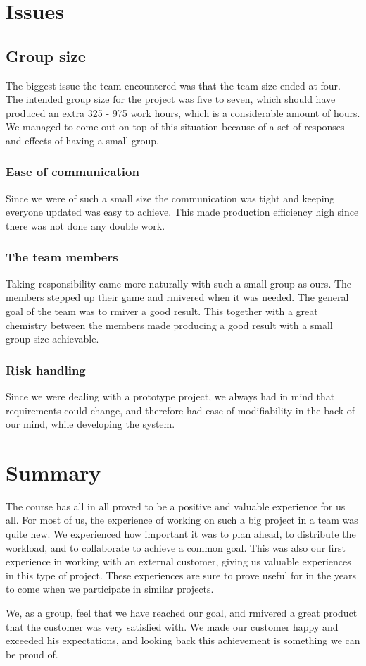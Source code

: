 \section{Issues}

\subsection*{Group size}
The biggest issue the team encountered was that the team size ended at four. The intended group size for the project was five to seven, which should have produced an extra 325 - 975 work hours, which is a considerable amount of hours. We managed to come out on top of this situation because of a set of responses and effects of having a small group.

\subsubsection*{Ease of communication}
Since we were of such a small size the communication was tight and keeping everyone updated was easy to achieve. This made production efficiency high since there was not done any double work.

\subsubsection*{The team members}
Taking responsibility came more naturally with such a small group as ours. The members stepped up their game and rmivered when it was needed. The general goal of the team was to rmiver a good result. This together with a great chemistry between the members made producing a good result with a small group size achievable.

\subsubsection*{Risk handling}
Since we were dealing with a prototype project, we always had in mind that requirements could change, and therefore had ease of modifiability in the back of our mind, while developing the system.

\section{Summary}
The course has all in all proved to be a positive and valuable experience for us all. For most of us, the experience of working on such a big project in a team was quite new. We experienced how important it was to plan ahead, to distribute the workload, and to collaborate to achieve a common goal. This was also our first experience in working with an external customer, giving us valuable experiences in this type of project. These experiences are sure to prove useful for in the years to come when we participate in similar projects.

We, as a group, feel that we have reached our goal, and rmivered a great product that the customer was very satisfied with. We made our customer happy and exceeded his expectations, and looking back this achievement is something we can be proud of.
